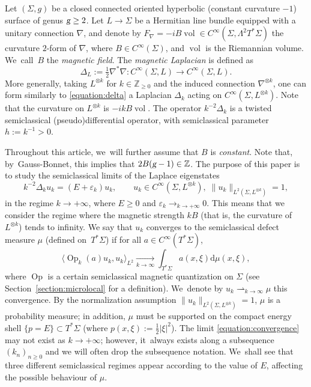 \documentclass[JEP,XML,SOM,Unicode,published]{cedram}
\theoremstyle{plain}
\theoremstyle{definition}
\newcommand{\Z}{\mathbb{Z}}
\let\eps\varepsilon
\newcommand{\dd}{\mathrm{d}}
\DeclareMathOperator{\Op}{Op}
\DeclareMathOperator{\vol}{vol}
\begin{document}
Let $(\Sigma,g)$ be a closed connected oriented hyperbolic (constant curvature $-1$) surface of genus $\textsl{g} \geq 2$. Let $L \to \Sigma$ be a Hermitian line bundle equipped with a unitary connection $\nabla$, and denote by $F_\nabla = -i B \vol \in C^\infty(\Sigma, \Lambda^2 T^*\Sigma)$ the curvature $2$-form of $\nabla$, where $B \in C^\infty(\Sigma)$, and $\vol$ is the Riemannian volume. We~call~$B$ the \emph{magnetic field}. The \emph{magnetic Laplacian} is defined as
\begin{equation}
\label{equation:delta}
\Delta_L := \tfrac{1}{2} \nabla^* \nabla : C^\infty(\Sigma,L) \to C^\infty(\Sigma,L).
\end{equation}
More generally, taking $L^{\otimes k}$ for $k \in \Z_{\geq 0}$ and the induced connection $\nabla^{\otimes k}$, one can form similarly to \eqref{equation:delta} a Laplacian $\Delta_k$ acting on $C^\infty(\Sigma,L^{\otimes k})$. {\color{black}Note that the curvature on $L^{\otimes k}$ is $-ikB\vol$.} The operator $k^{-2}\Delta_k$ is a twisted semiclassical (pseudo)differential operator, with semiclassical parameter $h := k^{-1} > 0$.

Throughout this article, we~will further assume that $B$ is \emph{constant}. Note that, by~Gauss-Bonnet, this implies that $2B(\textsl{g}-1) \in \Z$. The purpose of this paper is to study the semiclassical limits of the Laplace eigenstates
\begin{equation}
\label{equation:eigenstates}
k^{-2}\Delta_k u_k = (E+\eps_k)u_k, \qquad u_k \in C^\infty(\Sigma,L^{\otimes
k}), \; \|u_k\|_{L^2(\Sigma,L^{\otimes k})} = 1,
\end{equation}
in the regime $k \to +\infty$, where $E \geq 0$ and $\eps_k \to_{k \to +\infty} 0$. {\color{black}This means that we consider the regime where the magnetic strength $kB$ (that is, the curvature of $L^{\otimes k}$) tends to infinity.} We say that $u_k$ converges to the semiclassical defect measure $\mu$ (defined on~$T^*\Sigma$) if for all $a \in C^\infty(T^*\Sigma)$,
\begin{equation}
\label{equation:convergence}
\langle\Op_{k}(a)u_{k},u_{k}\rangle_{L^2} \underset{k \to \infty}\to \int_{T^*\Sigma} a(x,\xi) \dd\mu(x,\xi),
\end{equation}
where $\Op$ is a certain semiclassical magnetic quantization on $\Sigma$ (see Section~\ref{section:microlocal} for a definition). We~denote by $u_k \rightharpoonup_{k \to \infty} \mu$ this convergence. By the normalization assumption $\|u_k\|_{L^2(\Sigma,L^{\otimes k})} = 1$, $\mu$ is a probability measure; in addition, $\mu$ must be supported on the compact energy shell $\{p=E\} \subset T^*\Sigma$ (where $p(x,\xi) := \tfrac{1}{2}|\xi|^2$). The limit \eqref{equation:convergence} may not exist as $k \to +\infty$; however, it~always exists along a subsequence $(k_n)_{n \geq 0}$ and we will often drop the subsequence notation. We~shall see that three different semiclassical regimes appear according to the value of $E$, affecting the possible behaviour of $\mu$.
\end{document}

